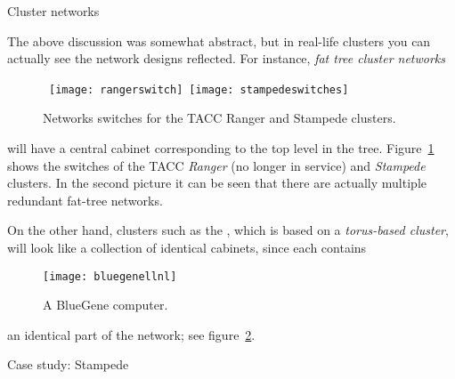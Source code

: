  {Cluster networks}

The above discussion was somewhat abstract, but in real-life clusters
you can actually see the network designs reflected. For instance,
\emph{fat tree cluster networks}
\begin{figure}[th]
  \hbox{%
    \texttt{[image: rangerswitch]}\kern1cm
    \texttt{[image: stampedeswitches]}%
  }
  \caption{Networks switches for the TACC Ranger and Stampede clusters.}
  \label{fig:taccswitches}
\end{figure}
will have a central cabinet corresponding to the top level in the tree.
Figure~\ref{fig:taccswitches} shows the switches of the TACC
\emph{Ranger} (no longer in service)
and \emph{Stampede} clusters.
In the second picture it can be seen that there are actually
multiple redundant fat-tree networks.

On the other hand, clusters such as the ,
which is based on a \emph{torus-based cluster},
will look like a collection of identical cabinets, since each contains
\begin{figure}[th]
  \texttt{[image: bluegenellnl]}
  \caption{A BlueGene computer.}
  \label{fig:bluegenep}
\end{figure}
an identical part of the network; see figure~\ref{fig:bluegenep}.

 {Case study: Stampede}
\label{sec:stampede-fattree}

